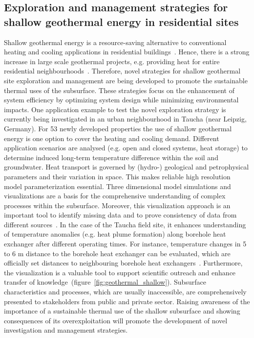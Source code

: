 \documentclass[twocolumn]{svjour3}          %
\begin{document}
\subsection{Exploration and management strategies for shallow geothermal energy in residential sites}
\label{shallow-geothermal}

Shallow geothermal energy is a resource-saving alternative to conventional heating and cooling applications in residential buildings~\cite{haehnlein:2013}. Hence, there is a strong increase in large scale geothermal projects, e.g. providing heat for entire residential neighbourhoods~\cite{alkan:2013}. Therefore, novel strategies for shallow geothermal site exploration and management are being developed to promote the sustainable thermal uses of the subsurface. These strategies focus on the enhancement of system efficiency by optimizing system design while minimizing environmental impacts. One application example to test the novel exploration strategy is currently being investigated in an urban neighbourhood in Taucha (near Leipzig, Germany). For 53 newly developed properties the use of shallow geothermal energy is one option to cover the heating and cooling demand. Different application scenarios are analysed (e.g. open and closed systems, heat storage) to determine induced long-term temperature difference within the soil and groundwater. Heat transport is governed by (hydro-) geological and petrophysical parameters and their variation in space. This makes reliable high resolution model parameterization essential. Three dimensional model simulations and visualizations are a basis for the comprehensive understanding of complex processes within the subsurface. Moreover, this visualization approach is an important tool to identify missing data and to prove consistency of data from different sources~\cite{vienken:2014}. In the case of the Taucha field site, it enhances understanding of temperature anomalies (e.g. heat plume formation) along borehole heat exchanger after different operating times. For instance, temperature changes in 5 to 6 m distance to the borehole heat exchanger can be evaluated, which are officially set distances to neighbouring borehole heat exchangers~\cite{haehnlein:2011}. Furthermore, the visualization is a valuable tool to support scientific outreach and enhance transfer of knowledge~(figure~\ref{fig:geothermal_shallow}). Subsurface characteristics and processes, which are usually inaccessible, are comprehensively presented to stakeholders from public and private sector. Raising awareness of the importance of a sustainable thermal use of the shallow subsurface and showing consequences of its overexploitation will promote the development of novel investigation and management strategies.
\end{document}
